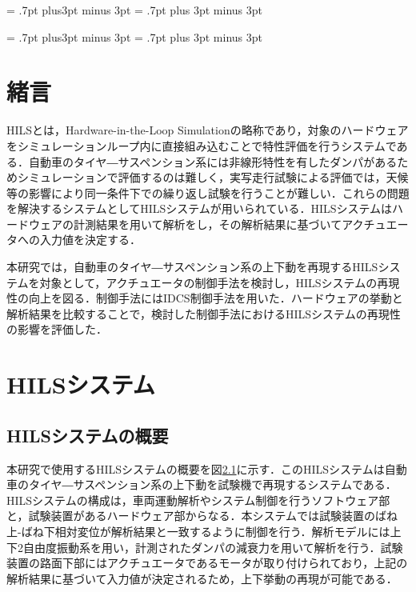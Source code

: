 \documentclass{article_vdlab_sotsuron_youshi}
\begin{document}
\kanjiskip = .7pt plus3pt minus 3pt
\xkanjiskip = .7pt plus 3pt minus 3pt
\small
{}

\setlength{\abovecaptionskip}{0mm}
\setlength{\belowcaptionskip}{0mm}
\setlength{\floatsep}{0mm}
\setlength{\textfloatsep}{0mm}
\setlength{\intextsep}{3mm}
\setlength{\dblfloatsep}{0mm}
\setlength{\dbltextfloatsep}{0mm}



\kanjiskip = .7pt plus3pt minus 3pt
\xkanjiskip = .7pt plus 3pt minus 3pt
\small
{}

\section{緒言}
HILSとは，Hardware-in-the-Loop Simulationの略称であり，対象のハードウェアをシミュレーションループ内に直接組み込むことで特性評価を行うシステムである．自動車のタイヤ―サスペンション系には非線形特性を有したダンパがあるためシミュレーションで評価するのは難しく，実写走行試験による評価では，天候等の影響により同一条件下での繰り返し試験を行うことが難しい．これらの問題を解決するシステムとしてHILSシステムが用いられている\cite{hils}．HILSシステムはハードウェアの計測結果を用いて解析をし，その解析結果に基づいてアクチュエータへの入力値を決定する．

本研究では，自動車のタイヤ―サスペンション系の上下動を再現するHILSシステムを対象として，アクチュエータの制御手法を検討し，HILSシステムの再現性の向上を図る．制御手法にはIDCS制御手法を用いた．ハードウェアの挙動と解析結果を比較することで，検討した制御手法におけるHILSシステムの再現性の影響を評価した．

\section{HILSシステム}
\subsection{HILSシステムの概要}
本研究で使用するHILSシステムの概要を図\ref{}に示す．このHILSシステムは自動車のタイヤ―サスペンション系の上下動を試験機で再現するシステムである．HILSシステムの構成は，車両運動解析やシステム制御を行うソフトウェア部と，試験装置があるハードウェア部からなる．本システムでは試験装置のばね上-ばね下相対変位が解析結果と一致するように制御を行う．解析モデルには上下2自由度振動系を用い，計測されたダンパの減衰力を用いて解析を行う．試験装置の路面下部にはアクチュエータであるモータが取り付けられており，上記の解析結果に基づいて入力値が決定されるため，上下挙動の再現が可能である．
\end{document}
